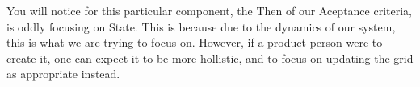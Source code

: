 You will notice for this particular component, the Then of our Aceptance
criteria, is oddly focusing on State. This is because due to the dynamics of our
system, this is what we are trying to focus on. However, if a product person
were to create it, one can expect it to be more hollistic, and to focus on
updating the grid as appropriate instead.
